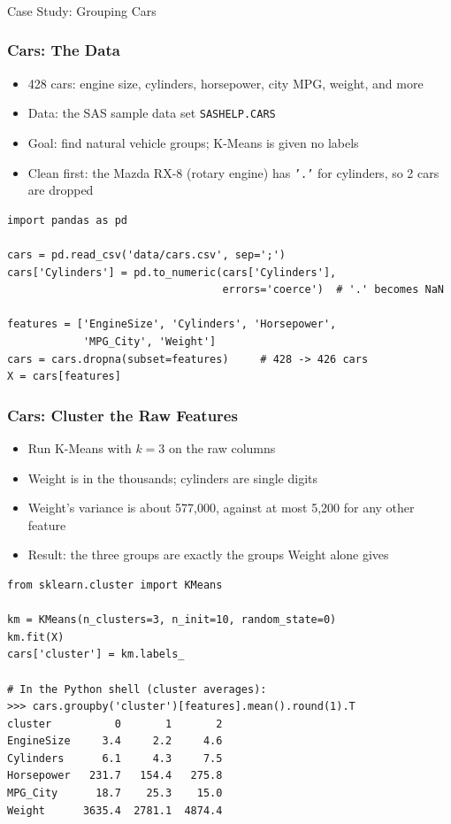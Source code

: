 \begin{frame}[fragile]\frametitle{}
\begin{center}
{\Large Case Study: Grouping Cars}
\end{center}
\end{frame}

\begin{frame}[fragile]\frametitle{Cars: The Data}
\begin{itemize}
\item 428 cars: engine size, cylinders, horsepower, city MPG, weight, and more
\item Data: the SAS sample data set \texttt{SASHELP.CARS}
\item Goal: find natural vehicle groups; K-Means is given no labels
\item Clean first: the Mazda RX-8 (rotary engine) has \texttt{'.'} for cylinders, so 2 cars are dropped
\end{itemize}
\begin{lstlisting}
import pandas as pd

cars = pd.read_csv('data/cars.csv', sep=';')
cars['Cylinders'] = pd.to_numeric(cars['Cylinders'],
                                  errors='coerce')  # '.' becomes NaN

features = ['EngineSize', 'Cylinders', 'Horsepower',
            'MPG_City', 'Weight']
cars = cars.dropna(subset=features)     # 428 -> 426 cars
X = cars[features]
\end{lstlisting}
\end{frame}

\begin{frame}[fragile]\frametitle{Cars: Cluster the Raw Features}
\begin{itemize}
\item Run K-Means with $k=3$ on the raw columns
\item Weight is in the thousands; cylinders are single digits
\item Weight's variance is about 577,000, against at most 5,200 for any other feature
\item Result: the three groups are exactly the groups Weight alone gives
\end{itemize}
\begin{lstlisting}
from sklearn.cluster import KMeans

km = KMeans(n_clusters=3, n_init=10, random_state=0)
km.fit(X)
cars['cluster'] = km.labels_

# In the Python shell (cluster averages):
>>> cars.groupby('cluster')[features].mean().round(1).T
cluster          0       1       2
EngineSize     3.4     2.2     4.6
Cylinders      6.1     4.3     7.5
Horsepower   231.7   154.4   275.8
MPG_City      18.7    25.3    15.0
Weight      3635.4  2781.1  4874.4
\end{lstlisting}
\end{frame}

